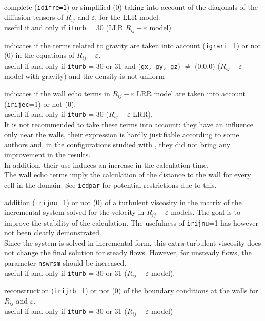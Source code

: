 {complete ({\tt idifre=1}) or simplified (0)
taking into account of the diagonals of the diffusion tensors of $R_{ij}$
and $\varepsilon$, for the LLR model.\\
useful if and only if {\tt iturb} = 30 (LLR $R_{ij}-\varepsilon$ model)}

{indicates if the terms related to gravity are
taken into account ({\tt igrari}=1) or not (0) in the equations of
$R_{ij}-\varepsilon$. \\
useful if and only if {\tt iturb} = 30 or 31 and ({\tt gx, gy, gz}) $\ne$
(0,0,0) ($R_{ij}-\varepsilon$ model with gravity) and the density is not uniform}

{indicates if the wall echo terms in
$R_{ij}-\varepsilon$ LRR model are
taken into account ({\tt irijec}=1) or not (0).\\
useful if and only if {\tt iturb} = 30 ($R_{ij}-\varepsilon$ LRR).\\
It is not recommended to take these terms into account:
they have an influence only near the walls, their expression is hardly
justifiable according to some authors and, in the configurations
studied with \CS, they did not bring any improvement in the results.\\
In addition, their use induces an increase in the calculation
time.\\
The wall echo terms imply the calculation of the distance to the wall
for every cell in the domain. See {\tt icdpar} for potential restrictions
due to this.}

{addition ({\tt irijnu}=1) or not (0) of a
turbulent viscosity in the matrix of the incremental system solved
for the velocity in $R_{ij}-\varepsilon$ models. The goal is to improve
the stability of the calculation. The usefulness of {\tt irijnu}=1 has
however not been clearly demonstrated.\\
Since the system is solved in incremental form, this extra turbulent
viscosity does not change the final solution for steady flows. However,
for unsteady flows, the parameter {\tt nswrsm} should be increased.\\
useful if and only if {\tt iturb} = 30 or 31 ($R_{ij}-\varepsilon$ model).}

{reconstruction ({\tt irijrb}=1)
or not (0) of the boundary conditions at the walls for $R_{ij}$ and  $\varepsilon$.\\
useful if and only if {\tt iturb} = 30 or 31 ($R_{ij}-\varepsilon$ model)}


